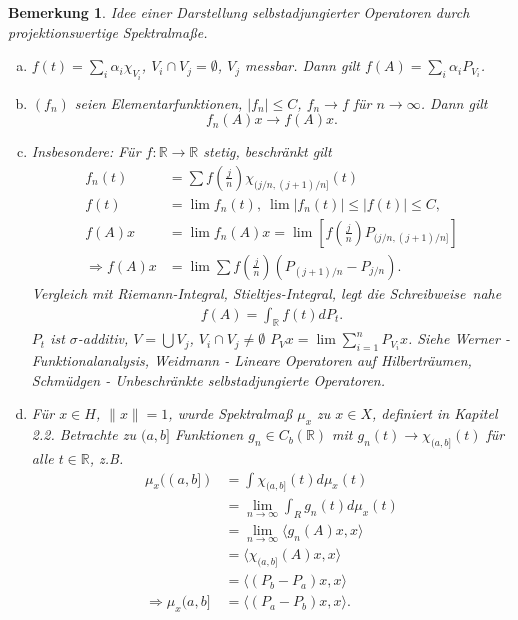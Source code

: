 \documentclass[12pt]{extreport} %
\newtheorem{Bemerkung}[Satz]{Bemerkung}
\numberwithin{equation}{section}
\newcommand{\R}{\mathbb{R}} %
\begin{document}
	\begin{Bemerkung}
		Idee einer Darstellung selbstadjungierter Operatoren durch projektionswertige Spektralmaße.
		\begin{enumerate}[a)]
			\item $f(t) = \sum_{i} \alpha_i\chi_{V_i}$, $V_i\cap V_j =\emptyset$, $V_j$ messbar. Dann gilt $f(A) = \sum_i \alpha_i P_{V_i}$.
			\item $(f_n)$ seien Elementarfunktionen, $|f_n|\leq C$, $f_n\rightarrow f$ für $n\rightarrow \infty$. Dann gilt
			$$f_n(A)x\rightarrow f(A)x.$$
			\item Insbesondere: Für $f:\R\rightarrow \R$ stetig, beschränkt gilt
			\begin{align*}
				f_n(t) &=\sum f\left(\frac{j}{n}\right) \chi_{(j/n,(j+1)/n]}(t)\\
				f(t) &= \lim f_n(t),~ \lim|f_n(t)| \leq |f(t)|\leq C,\\
				f(A)x &= \lim f_n(A)x = \lim\left[f\left(\frac{j}{n} \right)P_{(j/n,(j+1)/n]} \right]\\
				\Rightarrow f(A)x &= \lim \sum f\left(\frac{j}{n} \right)\left(P_{(j+1)/n}-P_{j/n} \right).
			\end{align*}
			Vergleich mit Riemann-Integral, Stieltjes-Integral, legt die \glqq Schreibweise\grqq\ nahe		
			\begin{align*}
				\boxed{f(A) = \int_{\R} f(t) dP_t.}
			\end{align*}
			$P_t$ ist $\sigma$-additiv, $V=\bigcup V_j$, $V_i\cap V_j\neq \emptyset$ $P_V x=\lim \sum_{i = 1}^n P_{V_i}x$. Siehe Werner - Funktionalanalysis, Weidmann - Lineare Operatoren auf Hilberträumen, Schmüdgen - Unbeschränkte selbstadjungierte Operatoren.
			\item Für $x\in H$, $\|x\| = 1$, wurde Spektralmaß $\mu_x$ zu $x\in X$, definiert in Kapitel 2.2. Betrachte zu $(a,b]$ Funktionen $g_n\in C_b(\R)$ mit $g_n(t) \rightarrow \chi_{(a,b]}(t)$ für alle $t\in \R$, z.B. 
			\begin{align*}
				\mu_x((a,b]) &= \int \chi_{(a,b]}(t) d\mu_x(t) \\
				&= \lim\limits_{n\rightarrow\infty}\int_{R} g_n(t)d\mu_x(t)\\
				&=\lim\limits_{n\rightarrow\infty} \langle g_n(A)x,x\rangle \\
				&= \langle \chi_{(a,b]}(A)x, x\rangle \\
				&= \langle (P_b-P_a)x,x\rangle\\
				\Rightarrow \mu_x(a,b] &= \langle (P_a-P_b)x, x\rangle.
			\end{align*}
		\end{enumerate}
	\end{Bemerkung}
	
\end{document}
